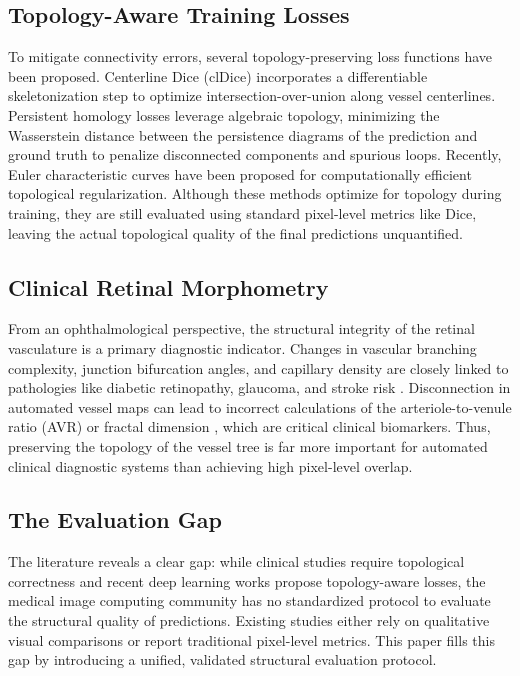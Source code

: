 \documentclass[conference]{IEEEtran}
\begin{document}
\subsection{Topology-Aware Training Losses}
To mitigate connectivity errors, several topology-preserving loss functions have been proposed. Centerline Dice (clDice) \cite{shit2021cldice} incorporates a differentiable skeletonization step to optimize intersection-over-union along vessel centerlines. Persistent homology losses \cite{clough2020topological, stucki2023topologically} leverage algebraic topology, minimizing the Wasserstein distance between the persistence diagrams of the prediction and ground truth to penalize disconnected components and spurious loops. Recently, Euler characteristic curves \cite{li2025topology} have been proposed for computationally efficient topological regularization. Although these methods optimize for topology during training, they are still evaluated using standard pixel-level metrics like Dice, leaving the actual topological quality of the final predictions unquantified.

\subsection{Clinical Retinal Morphometry}
From an ophthalmological perspective, the structural integrity of the retinal vasculature is a primary diagnostic indicator. Changes in vascular branching complexity, junction bifurcation angles, and capillary density are closely linked to pathologies like diabetic retinopathy, glaucoma, and stroke risk \cite{cheung2010retinal, patton2006retinal}. Disconnection in automated vessel maps can lead to incorrect calculations of the arteriole-to-venule ratio (AVR) or fractal dimension \cite{wong2005fractal}, which are critical clinical biomarkers. Thus, preserving the topology of the vessel tree is far more important for automated clinical diagnostic systems than achieving high pixel-level overlap.

\subsection{The Evaluation Gap}
The literature reveals a clear gap: while clinical studies require topological correctness and recent deep learning works propose topology-aware losses, the medical image computing community has no standardized protocol to evaluate the structural quality of predictions. Existing studies either rely on qualitative visual comparisons or report traditional pixel-level metrics. This paper fills this gap by introducing a unified, validated structural evaluation protocol.
\end{document}

